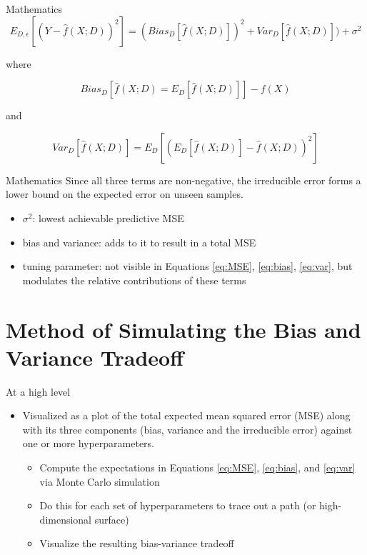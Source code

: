 \documentclass[
  ignorenonframetext,
]{beamer}
\providecommand{\tightlist}{%
  \setlength{\itemsep}{0pt}\setlength{\parskip}{0pt}}
\begin{document}
\begin{frame}{Mathematics}
\protect\hypertarget{mathematics-1}{}
\begin{equation}
E_{D, \epsilon} [(Y - \hat f(X; D))^2] = (Bias_D [\hat f(X; D)])^2 + Var_D [\hat f(X; D)]) + \sigma^2 \label{eq:MSE}
\end{equation}

where

\begin{equation}
Bias_D[\hat f(X; D) = E_D[\hat f(X; D)]] - f(X) \label{eq:bias}
\end{equation}

and

\begin{equation}
Var_D [\hat f(X; D)] = E_D[(E_D [\hat f(X; D)] - \hat f(X; D))^2] \label{eq:var}
\end{equation}
\end{frame}

\begin{frame}{Mathematics}
\protect\hypertarget{mathematics-2}{}
Since all three terms are non-negative, the irreducible error forms a lower bound on the expected error on unseen samples.

\begin{itemize}
\tightlist
\item
  \(\sigma^2\): lowest achievable predictive MSE
\item
  bias and variance: adds to it to result in a total MSE
\item
  tuning parameter: not visible in Equations \eqref{eq:MSE}, \eqref{eq:bias}, \eqref{eq:var}, but modulates the relative contributions of these terms
\end{itemize}
\end{frame}

\hypertarget{method-of-simulating-the-bias-and-variance-tradeoff}{%
\section{Method of Simulating the Bias and Variance Tradeoff}\label{method-of-simulating-the-bias-and-variance-tradeoff}}

\begin{frame}{At a high level}
\protect\hypertarget{at-a-high-level}{}
\begin{itemize}
\tightlist
\item
  Visualized as a plot of the total expected mean squared error (MSE) along with its three components (bias, variance and the irreducible error) against one or more hyperparameters.

  \begin{itemize}
  \tightlist
  \item
    Compute the expectations in Equations \eqref{eq:MSE}, \eqref{eq:bias}, and \eqref{eq:var} via Monte Carlo simulation
  \item
    Do this for each set of hyperparameters to trace out a path (or high-dimensional surface)
  \item
    Visualize the resulting bias-variance tradeoff
  \end{itemize}
\end{itemize}
\end{frame}
\end{document}
